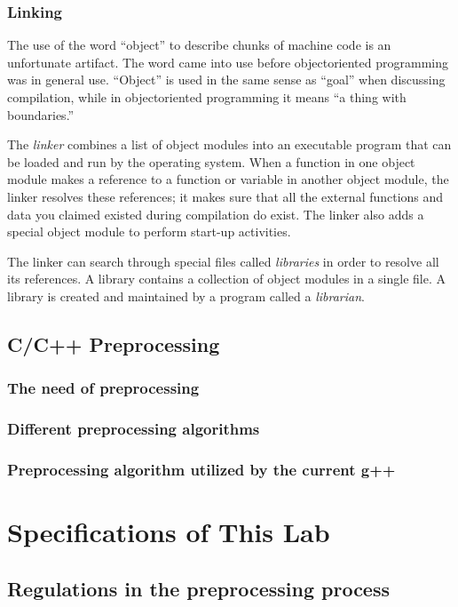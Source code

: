 \documentclass[a4paper]{report}
\begin{document}
\subsection{Linking}
The use of the word “object” to describe chunks of machine code is an unfortunate artifact. The word came into use before objectoriented programming was in general use. “Object” is used in the same sense as “goal” when discussing compilation, while in objectoriented programming it means “a thing with boundaries.” 
\par
The \emph{linker} combines a list of object modules into an executable program that can be loaded and run by the operating system. When a function in one object module makes a reference to a function or variable in another object module, the linker resolves these references; it makes sure that all the external functions and data you claimed existed during compilation do exist. The linker also adds a special object module to perform start-up activities. 
\par
The linker can search through special files called \emph{libraries} in order to resolve all its references. A library contains a collection of object modules in a single file. A library is created and maintained by a program called a \emph{librarian}. 
\section{C/C++ Preprocessing}

\subsection{The need of preprocessing}


\subsection{Different preprocessing algorithms}


\subsection{Preprocessing algorithm utilized by the current g++}


\chapter{Specifications of This Lab}
\section{Regulations in the preprocessing process}
\end{document}
